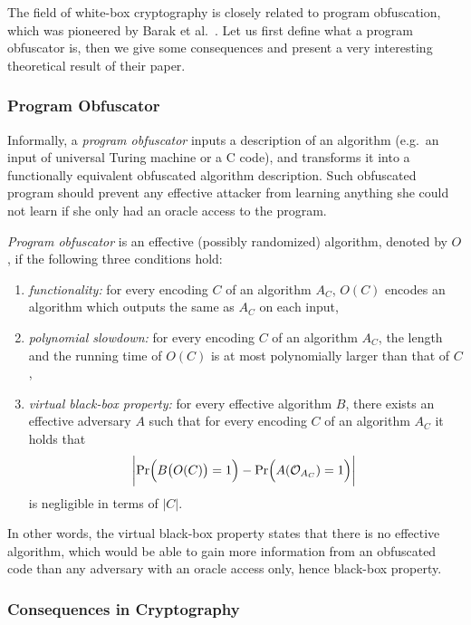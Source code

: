 The field of white-box cryptography is closely related to program obfuscation, which was pioneered by Barak et al.\ \cite{barak2001possibility}. Let us first define what a program obfuscator is, then we give some consequences and present a very interesting theoretical result of their paper.

\subsubsection{Program Obfuscator}
	
	Informally, a {\em program obfuscator} inputs a description of an algorithm (e.g.\ an input of universal Turing machine or a C code), and transforms it into a functionally equivalent obfuscated algorithm description. Such obfuscated program should prevent any effective attacker from learning anything she could not learn if she only had an oracle access to the program.
	
	\begin{defn}
	\label{def:obfus}
		{\em Program obfuscator} is an effective (possibly randomized) algorithm, denoted by $O$, if the following three conditions hold:
		\begin{enumerate}
			\item {\em functionality:} for every encoding $C$ of an algorithm $A_C$, $O(C)$ encodes an algorithm which outputs the same as $A_C$ on each input,
			\item {\em polynomial slowdown:} for every encoding $C$ of an algorithm $A_C$, the length and the running time of $O(C)$ is at most polynomially larger than that of $C$,
			\item {\em virtual black-box property:} for every effective algorithm $B$, there exists an effective adversary $A$ such that for every encoding $C$ of an algorithm $A_C$ it holds that
			\[
				\biggl| \Pr\Bigl(B\bigl(O(C)\bigr)=1\Bigr) - \Pr\Bigl(A({\cal O}_{A_C})=1\Bigr) \biggr| \
			\]
			is negligible in terms of $|C|$.
		\end{enumerate}
	\end{defn}
	
	In other words, the virtual black-box property states that there is no effective algorithm, which would be able to gain more information from an obfuscated code than any adversary with an oracle access only, hence black-box property.

\subsubsection{Consequences in Cryptography}
	
